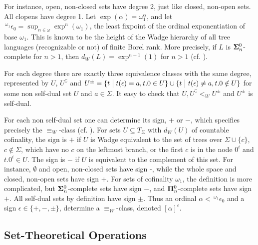 For instance, open, non-closed sets have degree 2, just like closed,
non-open sets. All clopens have degree 1. 
Let $\exp(\alpha) = \omega_1^\alpha$, and let 
$\,{}^{\omega_1} \epsilon_0 = \sup_{n \in\omega} \exp^n(\omega_1)$, the least fixpoint of the 
ordinal exponentiation of base $\omega_1$. This is known to be the
height of the Wadge hierarchy of all tree languages (recognizable or
not) of finite Borel rank. More precisely, if $L$ is ${\bf
  \Sigma}^0_n$-complete for $n>1$, then $d_W(L) = \exp^{n-1}(1)$ for $n>1$  (cf. \cite{dup1}).

For each degree there are exactly three equivalence
classes with the same degree, represented by $U$, $U^\complement$ and
$U^\pm = \{t \bigm | t(\epsilon) = a, t.0\in U \} \cup  \{t \bigm |
t(\epsilon) \neq a, t.0\notin U \}$ for some non self-dual set $U$ and
$a\in\Sigma$. It easy to check that $U, U^\complement <_W U^\pm$ and
$U^\pm$ is self-dual.

For each non self-dual set one can determine its sign, $+$
or $-$, which specifies precisely the $\equiv_W$-class
(cf. \cite{dup1}). For sets $U\subseteq T_\Sigma$ with $d_W(U)$ of countable cofinality, the sign
is $+$ if $U$ is Wadge equivalent to the set of trees over $\Sigma
\cup \{c\}$, $c\notin \Sigma$, which have no $c$ on the leftmost
branch, or the first $c$ is in the node $0^i$ and $t.0^i \in U$. The
sign is $-$ if $U$ is equivalent to the complement of this set. 
For instance, $\emptyset$ and open, non-closed sets have sign -,
while the whole space and closed, non-open sets have sign $+$.
For sets of cofinality $\omega_1$, the definition is more complicated, but
${\bf \Sigma}^0_n$-complete sets have sign $-$, and ${\bf
  \Pi}^0_n$-complete sets have sign $+$. All self-dual sets by
definition have sign $\pm$. Thus an ordinal $\alpha <\,
{}^{\omega_1}\epsilon_0$ and a sign $\epsilon \in \{+,-,\pm\}$,
determine a $\equiv_W$-class, denoted  $[\alpha]^\epsilon$. 

\subsection{Set-Theoretical Operations}

